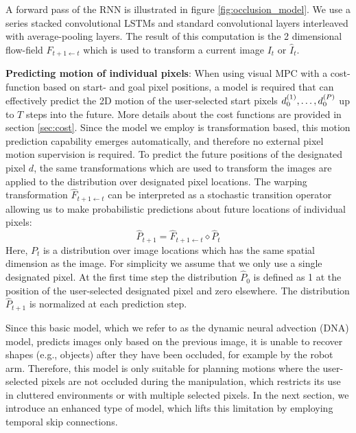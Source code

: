 \label{subsec:pixel_trafo}
A forward pass of the RNN is illustrated in figure \ref{fig:occlusion_model}. We use a series stacked convolutional LSTMs and standard convolutional layers interleaved with average-pooling layers. The result of this computation is the 2 dimensional flow-field $\hat{F}_{t+1 \leftarrow t}$ which is used to transform a current image $I_t$ or $\hat{I}_t$.

\noindent \textbf{Predicting motion of individual pixels}: 
When using visual MPC with a cost-function based on start- and goal pixel positions, a model is required that can effectively predict the 2D motion of the user-selected start pixels $d_0^{(1)}, \dots, d_0^{(P)}$ up to $T$ steps into the future. More details about the cost functions are provided in section \ref{sec:cost}. Since the model we employ is transformation based, this motion prediction capability emerges automatically, and therefore no external pixel motion supervision is required. To predict the future positions of the designated pixel $d$, the same transformations which are used to transform the images are applied to the distribution over designated pixel locations. The warping transformation $\hat{F}_{t+1 \leftarrow t}$ can be interpreted as a stochastic transition operator allowing us to make probabilistic predictions about future locations of individual pixels:
\begin{equation}
\hat{P}_{t+1} = \hat{F}_{t+1 \leftarrow t} \diamond  \hat{P}_t
\label{eqn:prob_forward}
\end{equation}
Here, $P_t$ is a distribution over image locations which has the same spatial dimension as the image. For simplicity we assume that we only use a single designated pixel. At the first time step the distribution $\hat{P}_0$ is defined as 1 at the position of the user-selected designated pixel and zero elsewhere. The distribution $\hat{P}_{t+1}$ is normalized at each prediction step.

Since this basic model, which we refer to as the dynamic neural advection (DNA) model, predicts images only based on the previous image, it is unable to recover shapes (e.g., objects) after they have been occluded, for example by the robot arm. Therefore, this model is only suitable for planning motions where the user-selected pixels are not occluded during the manipulation, which restricts its use in cluttered environments or with multiple selected pixels. In the next section, we introduce an enhanced type of model, which lifts this limitation by employing temporal skip connections.

